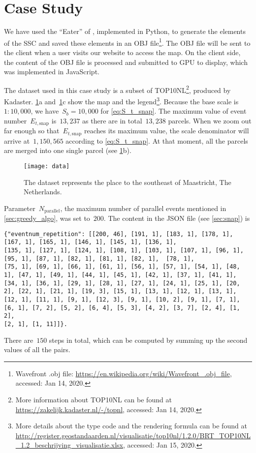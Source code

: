 \documentclass[ijgi,article,submit,moreauthors,pdftex]{Definitions/mdpi}
\begin{document}
\section{Case Study}
\label{sec:case_study}

We have used the ``Eater'' of \citet{Suba2014Merge},
implemented in Python, 
to generate the elements of the SSC \citep{vanOosterom2014tGAPSSC} 
and saved these elements in an OBJ file\footnote{%
Wavefront .obj file:
\url{https://en.wikipedia.org/wiki/Wavefront_.obj_file},
accessed: Jan 14, 2020.}.
%
The OBJ file will be sent to the client 
when a user visits our website to access the map.
On the client side,
the content of the OBJ file is processed and submitted to GPU to display,
which was implemented in JavaScript.

The dataset used in this case study is a subset of TOP10NL\footnote{%
More information about TOP10NL can be found at
\url{https://zakelijk.kadaster.nl/-/topnl},
accessed: Jan 14, 2020.},
produced by Kadaster.
%
\figs\ref{fig:data}a and~\ref{fig:data}c show the map and the legend\footnote{%
More details about the type code and the rendering formula can be found at
\url{http://register.geostandaarden.nl/visualisatie/top10nl/1.2.0/BRT_TOP10NL_1.2_beschrijving_visualisatie.xlsx},
accessed: Jan 15, 2020.}.
%
Because the base scale is $1:10{,}000$, 
we have~$S_b = 10{,}000$ for \eq\ref{eq:S_t_snap}.
The maximum value of event number~$E_{t,\mathrm{snap}}$ is~$13{,}237$
as there are in total~$13{,}238$ parcels.
When we zoom out far enough 
so that~$E_{t,\mathrm{snap}}$ reaches its maximum value,
the scale denominator will arrive at~$1{,}150{,}565$
according to \eq\ref{eq:S_t_snap}.
At that moment, all the parcels are merged into one single parcel
(see \figs\ref{fig:data}b).


\begin{figure}[tb]
\centering
\texttt{[image: data]}
\caption{The dataset represents the place 
    to the southeast of Maastricht, The Netherlands.}
\label{fig:data}
\end{figure}


Parameter~$N_\mathrm{parallel}$, 
the maximum number of parallel events mentioned in \sect\ref{sec:greedy_algo},
was set to~$200$.
The content in the JSON file (see \sect\ref{sec:snap}) is 
\makeatletter
\def\verbatim@font{\normalfont\rmfamily}
\makeatother
\begin{verbatim}
{"eventnum_repetition": [[200, 46], [191, 1], [183, 1], [178, 1], [167, 1], [165, 1], [146, 1], [145, 1], [136, 1], 
[135, 1], [127, 1], [124, 1], [108, 1], [103, 1], [107, 1], [96, 1], [95, 1], [87, 1], [82, 1], [81, 1], [82, 1],  [78, 1], 
[75, 1], [69, 1], [66, 1], [61, 1], [56, 1], [57, 1], [54, 1], [48, 1], [47, 1], [49, 1], [44, 1], [45, 1], [42, 1], [37, 1], [41, 1], 
[34, 1], [36, 1], [29, 1], [28, 1], [27, 1], [24, 1], [25, 1], [20, 2], [22, 1], [21, 1], [19, 3], [15, 1], [13, 1], [12, 1], [13, 1], 
[12, 1], [11, 1], [9, 1], [12, 3], [9, 1], [10, 2], [9, 1], [7, 1], [6, 1], [7, 2], [5, 2], [6, 4], [5, 3], [4, 2], [3, 7], [2, 4], [1, 2], 
[2, 1], [1, 11]]}.
\end{verbatim}
There are~$150$ steps in total, 
which can be computed by summing up the second values of all the pairs.
\end{document}
